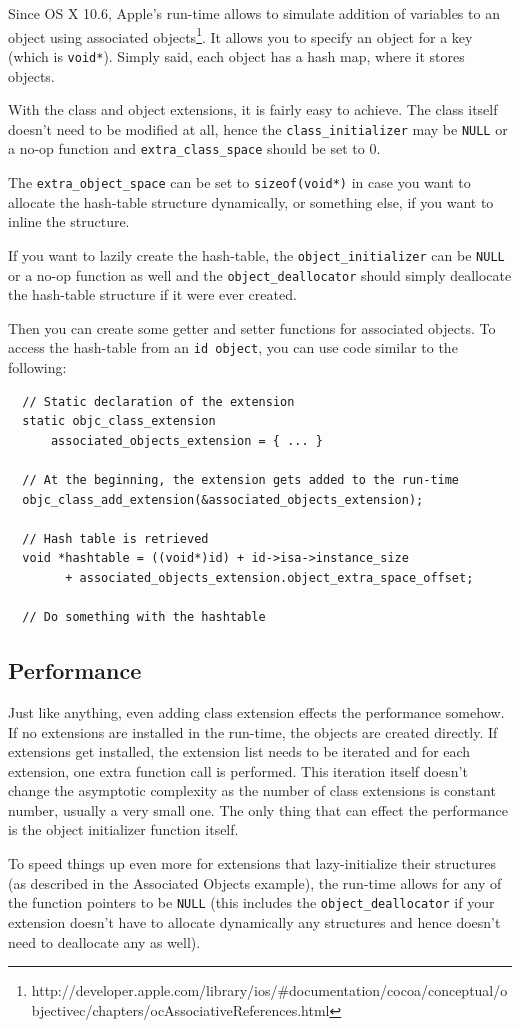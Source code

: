 Since OS X 10.6, Apple's run-time allows to simulate addition of variables to an object using associated objects\footnote{http://developer.apple.com/library/ios/#documentation/cocoa/conceptual/objectivec/chapters/ocAssociativeReferences.html}. It allows you to specify an object for a key (which is \verb=void*=). Simply said, each object has a hash map, where it stores objects.

With the class and object extensions, it is fairly easy to achieve. The class itself doesn't need to be modified at all, hence the \verb=class_initializer= may be \verb=NULL= or a no-op function and \verb=extra_class_space= should be set to 0.

The \verb=extra_object_space= can be set to \verb=sizeof(void*)= in case you want to allocate the hash-table structure dynamically, or something else, if you want to inline the structure.

If you want to lazily create the hash-table, the \verb=object_initializer= can be \verb=NULL= or a no-op function as well and the \verb=object_deallocator= should simply deallocate the hash-table structure if it were ever created.

Then you can create some getter and setter functions for associated objects. To access the hash-table from an \verb=id object=, you can use code similar to the following:

\begin{verbatim}
  // Static declaration of the extension
  static objc_class_extension 
      associated_objects_extension = { ... }

  // At the beginning, the extension gets added to the run-time
  objc_class_add_extension(&associated_objects_extension);

  // Hash table is retrieved
  void *hashtable = ((void*)id) + id->isa->instance_size 
        + associated_objects_extension.object_extra_space_offset;
        
  // Do something with the hashtable
\end{verbatim}


\subsection{Performance}
Just like anything, even adding class extension effects the performance somehow. If no extensions are installed in the run-time, the objects are created directly. If extensions get installed, the extension list needs to be iterated and for each extension, one extra function call is performed. This iteration itself doesn't change the asymptotic complexity as the number of class extensions is constant number, usually a very small one. The only thing that can effect the performance is the object initializer function itself.

To speed things up even more for extensions that lazy-initialize their structures (as described in the Associated Objects example), the run-time allows for any of the function pointers to be \verb=NULL= (this includes the \verb=object_deallocator= if your extension doesn't have to allocate dynamically any structures and hence doesn't need to deallocate any as well).
